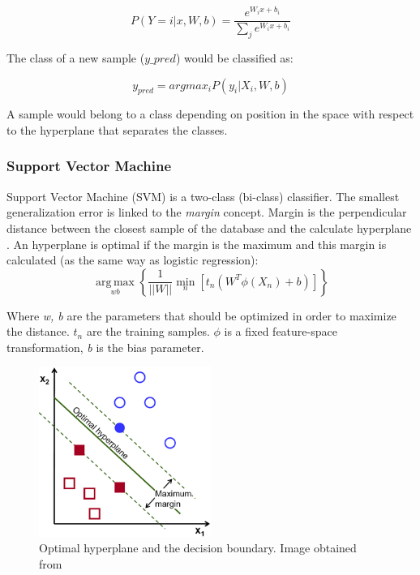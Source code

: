 \begin{equation}
P(Y=i|x,W,b) = \frac{e^{W_ix+b_i}}{\sum_j e^{W_ix+b_i}}
\end{equation}

The class of a new sample ($y\_{pred}$) would be classified as:

\begin{equation}
y_{pred} = argmax_{i}P(y_i|X_i,W,b)
\end{equation}

A sample would belong to a class depending on position in the space with respect to the hyperplane that separates the classes.\\

\subsubsection{Support Vector Machine}
Support Vector Machine (SVM) is a two-class (bi-class) classifier. The smallest generalization error is linked to the \textit{margin} concept. Margin is the perpendicular distance between the closest sample of the database and the calculate hyperplane \cite{MachineLearning}. An hyperplane is optimal if the margin is the maximum and this margin is calculated (as the same way as logistic regression):\\

\begin{equation}
\underset{w b}{\operatorname{arg\,max}}\left \{ \frac{1}{||W||} \underset{n}{\operatorname{min}}[t_{n}(W^T \phi (X_n)+b)]   \right \}
\end{equation}


Where \textit{w, b} are the parameters that should be optimized in order to maximize the distance. \textit{$t_n$} are the training samples. $\phi$ is a fixed feature-space transformation, \textit{b} is the bias parameter.\\

\begin{figure}[htb]
\centering
\includegraphics[width=0.5\textwidth]{images_miscelaneus/svm.png}
\caption{Optimal hyperplane and the decision boundary. Image obtained from \cite{SVMimage}} \label{fig:SVM}
\end{figure}

